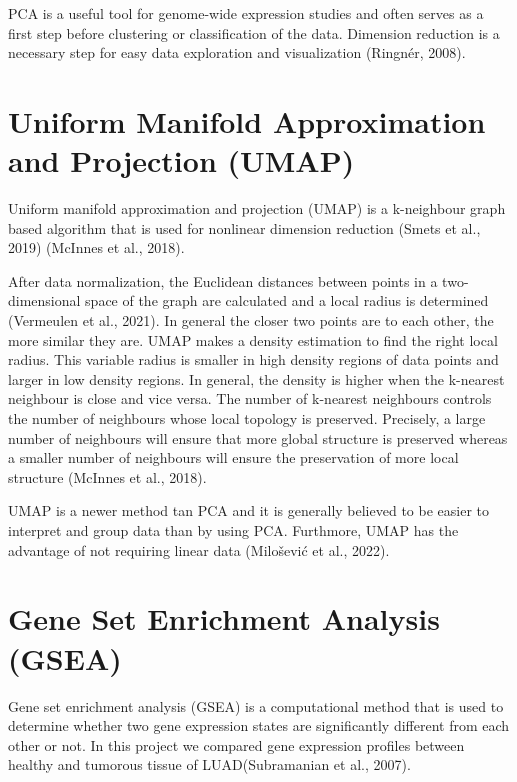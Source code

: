 \documentclass[
  parskip,
  oneside]{scrreprt}
\begin{document}
PCA is a useful tool for genome-wide expression studies and often serves
as a first step before clustering or classification of the data.
Dimension reduction is a necessary step for easy data exploration and
visualization (Ringnér, 2008).

\hypertarget{uniform-manifold-approximation-and-projection-umap}{%
\section{Uniform Manifold Approximation and Projection
(UMAP)}\label{uniform-manifold-approximation-and-projection-umap}}

Uniform manifold approximation and projection (UMAP) is a k-neighbour
graph based algorithm that is used for nonlinear dimension reduction
(Smets et al., 2019) (McInnes et al., 2018).

After data normalization, the Euclidean distances between points in a
two-dimensional space of the graph are calculated and a local radius is
determined (Vermeulen et al., 2021). In general the closer two points
are to each other, the more similar they are. UMAP makes a density
estimation to find the right local radius. This variable radius is
smaller in high density regions of data points and larger in low density
regions. In general, the density is higher when the k-nearest neighbour
is close and vice versa. The number of k-nearest neighbours controls the
number of neighbours whose local topology is preserved. Precisely, a
large number of neighbours will ensure that more global structure is
preserved whereas a smaller number of neighbours will ensure the
preservation of more local structure (McInnes et al., 2018).

UMAP is a newer method tan PCA and it is generally believed to be easier
to interpret and group data than by using PCA. Furthmore, UMAP has the
advantage of not requiring linear data (Milošević et al., 2022).

\hypertarget{gene-set-enrichment-analysis-gsea}{%
\section{Gene Set Enrichment Analysis
(GSEA)}\label{gene-set-enrichment-analysis-gsea}}

Gene set enrichment analysis (GSEA) is a computational method that is
used to determine whether two gene expression states are significantly
different from each other or not. In this project we compared gene
expression profiles between healthy and tumorous tissue of
LUAD(Subramanian et al., 2007).
\end{document}

